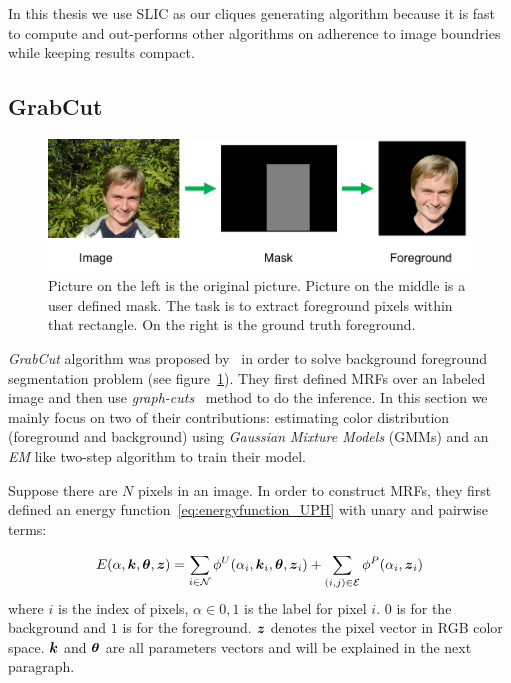 In this thesis we use SLIC as our cliques generating algorithm
because it is fast to compute and out-performs other algorithms
on adherence to image boundries while keeping results compact.

\subsection{GrabCut}
\label{sec:grabcut}

\begin{figure}[b]
  \centering
  \includegraphics[width=1\linewidth]{RelatedWorks/figures/grabcut_task.png}
  \caption{\label{fig:grabcut_example} Picture on the left is
    the original picture. Picture
    on the middle is a user defined mask. The task is to extract
    foreground pixels within that rectangle. On the right is the
    ground truth foreground.}
\end{figure}

\emph{GrabCut} algorithm was proposed
by~ in order to solve background
foreground segmentation problem (see figure~\ref{fig:grabcut_example}). They first defined MRFs over an
labeled image and then use \emph{graph-cuts}~\cite{Boykov:ICCV01} method to do the
inference. In this section we mainly focus on two of their
contributions: estimating color distribution (foreground and
background) using \emph{Gaussian Mixture Models} (GMMs) and an
\emph{EM} like two-step algorithm to train their model.

Suppose there are $N$ pixels in an image. In order to construct
MRFs, they first defined an energy
function~\eqref{eq:energyfunction_UPH} with unary and pairwise
terms:

\begin{align}
  \label{eq:grabcut_energy}
  E(\alpha, {\boldsymbol{k}}, \boldsymbol{\theta}, {\boldsymbol{z}}) = 
  \sum_{i\in {\cal N}}{\phi^U(\alpha_i, {\boldsymbol{k}}_i, \boldsymbol{\theta}, {\boldsymbol{z}}_i)}+
  \sum_{(i,j)\in {\cal E}}{\phi^P(\alpha_i,{\boldsymbol{z}}_i)}
\end{align}
where $i$ is the index of pixels, $\alpha \in {0,1}$ is the label
for pixel $i$. $0$ is for the background and $1$ is for the
foreground. ${\boldsymbol{z}}$ denotes the pixel vector in RGB color space.
${\boldsymbol{k}}$ and $\boldsymbol{\theta}$ are all parameters vectors and will be
explained in the next paragraph. 

